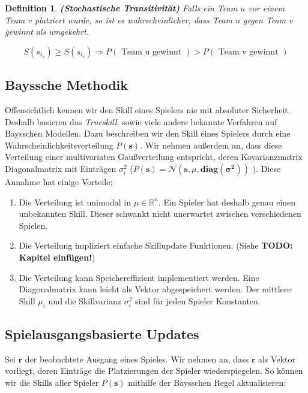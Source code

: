 \documentclass[12pt,a4paper]{scrartcl}
\newtheorem{Definition}[Satz]{Definition}
\numberwithin{equation}{section}
\newcommand{\R}{\mathbb{R}} %
\begin{document}
\begin{Definition}\textbf{(Stochastische Transitivität)}
Falls ein Team $u$ vor einem Team $v$ platziert wurde, so ist es wahrscheinlicher, dass Team $u$ gegen Team $v$ gewinnt als umgekehrt.

\begin{equation}
 S(s_{i_{u}}) \geq S(s_{i_{v}}) \Rightarrow P(\text{ Team u gewinnt }) > P(\text{ Team v gewinnt })
\end{equation}

\end{Definition}

\subsection{Bayssche Methodik}

Offensichtlich kennen wir den Skill eines Spielers nie mit absoluter Sicherheit. Deshalb basieren das \textit{Trueskill}, sowie viele andere bekannte Verfahren auf Baysschen Modellen. Dazu beschreiben wir den Skill eines
Spielers durch eine Wahrscheinlichkeitsverteilung $P(\textbf{s})$. Wir nehmen außerdem an, dass diese Verteilung einer multivariaten Gaußverteilung entspricht, deren Kovarianzmatrix
Diagonalmatrix mit Einträgen $\sigma_i^2$ ($P(\mathbf{s}) = \mathcal{N}(\mathbf{s},\mathbb{\mu},\mathbf{diag(\sigma^2)})$ ). Diese Annahme hat einige Vorteile: 
\begin{enumerate}
 \item Die Verteilung ist unimodal in $\mu \in \R^n$. Ein Spieler hat deshalb genau einen unbekannten Skill. Dieser schwankt nicht unerwartet zwischen verschiedenen Spielen.
 \item Die Verteilung impliziert einfache Skillupdate Funktionen. (Siehe \textbf{TODO: Kapitel einfügen!})
 \item Die Verteilung kann Speichereffizient implementiert werden. Eine Diagonalmatrix kann leicht als Vektor abgespeichert werden. Der mittlere Skill $\mu_i$ und die Skillvarianz $\sigma_i^2$ sind für jeden Spieler 
 Konstanten.
\end{enumerate}

\subsection{Spielausgangsbasierte Updates}
Sei $\mathbf{r}$ der beobachtete Ausgang eines Spieles. Wir nehmen an, dass $\mathbf{r}$ als Vektor vorliegt, deren Einträge die Platzierungen der Spieler wiederspiegelen. So können wir die Skills aller Spieler $P(\textbf{s})$
mithilfe der Baysschen Regel aktualisieren: 
\end{document}

